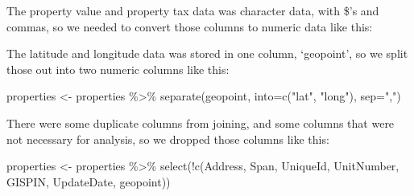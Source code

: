 \documentclass[
]{article}
\newenvironment{Shaded}{\begin{snugshade}}{\end{snugshade}}
\newcommand{\AttributeTok}[1]{\textcolor[rgb]{0.77,0.63,0.00}{#1}}
\newcommand{\FunctionTok}[1]{\textcolor[rgb]{0.00,0.00,0.00}{#1}}
\newcommand{\NormalTok}[1]{#1}
\newcommand{\OtherTok}[1]{\textcolor[rgb]{0.56,0.35,0.01}{#1}}
\newcommand{\SpecialCharTok}[1]{\textcolor[rgb]{0.00,0.00,0.00}{#1}}
\newcommand{\StringTok}[1]{\textcolor[rgb]{0.31,0.60,0.02}{#1}}
\begin{document}
The property value and property tax data was character data, with \$'s
and commas, so we needed to convert those columns to numeric data like
this:

\begin{Shaded}
\end{Shaded}

The latitude and longitude data was stored in one column, `geopoint', so
we split those out into two numeric columns like this:

\begin{Shaded}
\begin{Highlighting}[]
\NormalTok{properties }\OtherTok{\textless{}{-}}\NormalTok{ properties }\SpecialCharTok{\%\textgreater{}\%} \FunctionTok{separate}\NormalTok{(geopoint, }\AttributeTok{into=}\FunctionTok{c}\NormalTok{(}\StringTok{"lat"}\NormalTok{, }\StringTok{"long"}\NormalTok{), }\AttributeTok{sep=}\StringTok{","}\NormalTok{)}
\end{Highlighting}
\end{Shaded}

There were some duplicate columns from joining, and some columns that
were not necessary for analysis, so we dropped those columns like this:

\begin{Shaded}
\begin{Highlighting}[]
\NormalTok{properties }\OtherTok{\textless{}{-}}\NormalTok{ properties }\SpecialCharTok{\%\textgreater{}\%} \FunctionTok{select}\NormalTok{(}\SpecialCharTok{!}\FunctionTok{c}\NormalTok{(Address, Span, UniqueId, UnitNumber, GISPIN, UpdateDate, geopoint))}
\end{Highlighting}
\end{Shaded}
\end{document}
